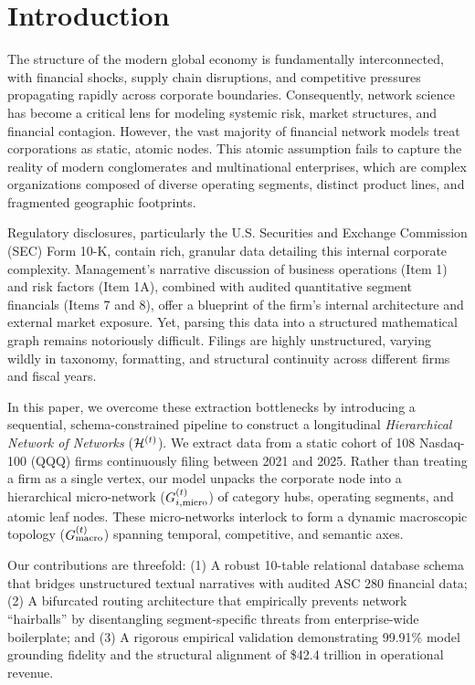 \section{Introduction}
\label{sec:intro}

The structure of the modern global economy is fundamentally interconnected, with financial shocks, supply chain disruptions, and competitive pressures propagating rapidly across corporate boundaries. Consequently, network science has become a critical lens for modeling systemic risk, market structures, and financial contagion. However, the vast majority of financial network models treat corporations as static, atomic nodes. This atomic assumption fails to capture the reality of modern conglomerates and multinational enterprises, which are complex organizations composed of diverse operating segments, distinct product lines, and fragmented geographic footprints.

Regulatory disclosures, particularly the U.S. Securities and Exchange Commission (SEC) Form 10-K, contain rich, granular data detailing this internal corporate complexity. Management's narrative discussion of business operations (Item 1) and risk factors (Item 1A), combined with audited quantitative segment financials (Items 7 and 8), offer a blueprint of the firm's internal architecture and external market exposure. Yet, parsing this data into a structured mathematical graph remains notoriously difficult. Filings are highly unstructured, varying wildly in taxonomy, formatting, and structural continuity across different firms and fiscal years.

In this paper, we overcome these extraction bottlenecks by introducing a sequential, schema-constrained pipeline to construct a longitudinal \textit{Hierarchical Network of Networks} ($\mathcal{H}^{(t)}$). We extract data from a static cohort of 108 Nasdaq-100 (QQQ) firms continuously filing between 2021 and 2025. Rather than treating a firm as a single vertex, our model unpacks the corporate node into a hierarchical micro-network ($G_{i,\text{micro}}^{(t)}$) of category hubs, operating segments, and atomic leaf nodes. These micro-networks interlock to form a dynamic macroscopic topology ($G_{\text{macro}}^{(t)}$) spanning temporal, competitive, and semantic axes.

Our contributions are threefold: (1) A robust 10-table relational database schema that bridges unstructured textual narratives with audited ASC 280 financial data; (2) A bifurcated routing architecture that empirically prevents network ``hairballs'' by disentangling segment-specific threats from enterprise-wide boilerplate; and (3) A rigorous empirical validation demonstrating 99.91\% model grounding fidelity and the structural alignment of \$42.4 trillion in operational revenue.